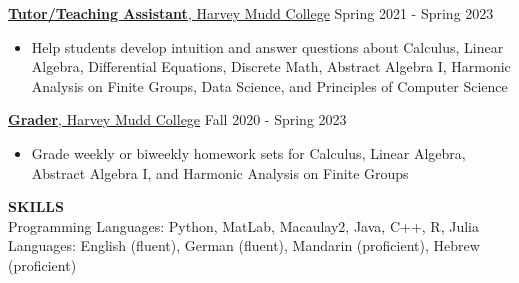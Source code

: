 \documentclass[11pt]{article}
\newcommand{\hdr}[1]{\textcolor{blue(ryb)}{\textbf{#1}}}
\newcommand{\role}[3]{\underline{\textbf{#1}, {#2}} \hfill #3}
\begin{document}
\role{Tutor/Teaching Assistant}{Harvey Mudd College}{Spring 2021 - Spring 2023}
\begin{itemize}
\item Help students develop intuition and answer questions about Calculus, Linear Algebra, Differential Equations, Discrete Math, Abstract Algebra I, Harmonic Analysis on Finite Groups, Data Science, and Principles of Computer Science
\end{itemize}
\smallskip
\role{Grader}{Harvey Mudd College}{Fall 2020 - Spring 2023}\\
\begin{itemize}
\item Grade weekly or biweekly homework sets for Calculus, Linear Algebra, Abstract Algebra I, and Harmonic Analysis on Finite Groups   
\end{itemize}
\bigskip
\hdr{SKILLS}\\
Programming Languages: Python, MatLab, Macaulay2, Java, C++, R, Julia\\
Languages: English (fluent), German (fluent), Mandarin (proficient), Hebrew (proficient)
\end{document}
